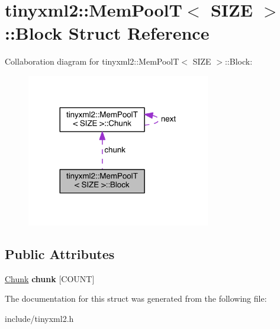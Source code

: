 \hypertarget{structtinyxml2_1_1_mem_pool_t_1_1_block}{}\section{tinyxml2\+:\+:Mem\+Pool\+T$<$ S\+I\+Z\+E $>$\+:\+:Block Struct Reference}
\label{structtinyxml2_1_1_mem_pool_t_1_1_block}


Collaboration diagram for tinyxml2\+:\+:Mem\+Pool\+T$<$ S\+I\+Z\+E $>$\+:\+:Block\+:\nopagebreak
\begin{figure}[H]
\begin{center}
\leavevmode
\includegraphics[width=227pt]{structtinyxml2_1_1_mem_pool_t_1_1_block__coll__graph}
\end{center}
\end{figure}
\subsection*{Public Attributes}
\begin{DoxyCompactItemize}
\item 
\hypertarget{structtinyxml2_1_1_mem_pool_t_1_1_block_ae9cbe79b82d9490f15cc00d9694989e8}{}\hyperlink{uniontinyxml2_1_1_mem_pool_t_1_1_chunk}{Chunk} {\bfseries chunk} \mbox{[}C\+O\+U\+N\+T\mbox{]}\label{structtinyxml2_1_1_mem_pool_t_1_1_block_ae9cbe79b82d9490f15cc00d9694989e8}

\end{DoxyCompactItemize}


The documentation for this struct was generated from the following file\+:\begin{DoxyCompactItemize}
\item 
include/tinyxml2.\+h\end{DoxyCompactItemize}
